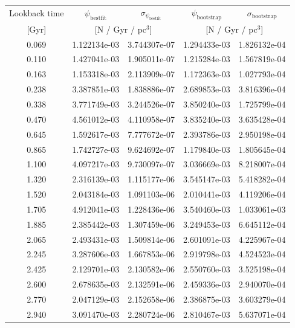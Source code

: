 \documentclass[fleqn,usenatbib]{mnras}
\begin{document}
\begin{table}
    \centering
    \begin{tabular}{c|cc|cc}
    Lookback time & $\psi_{\mathrm{best fit}}$ & $\sigma_{\psi_{\mathrm{best fit}}}$ & $\psi_{\mathrm{bootstrap}}$ & $\sigma_{\mathrm{bootstrap}}$ \\
         {[Gyr]} & \multicolumn{2}{c|}{[N / Gyr / pc$^3$]} & \multicolumn{2}{c}{[N / Gyr / pc$^3$]} \\\hline\hline
    0.069  & 1.122134e-03 & 3.744307e-07 & 1.294433e-03 & 1.826132e-04 \\
    0.110  & 1.427041e-03 & 1.905011e-07 & 1.215284e-03 & 1.567819e-04 \\
    0.163  & 1.153318e-03 & 2.113909e-07 & 1.172363e-03 & 1.027793e-04 \\
    0.238  & 3.387851e-03 & 1.838886e-07 & 2.689853e-03 & 3.816396e-04 \\
    0.338  & 3.771749e-03 & 3.244526e-07 & 3.850240e-03 & 1.725799e-04 \\ \hline
    0.470  & 4.561012e-03 & 4.110958e-07 & 3.835240e-03 & 3.635428e-04 \\
    0.645  & 1.592617e-03 & 7.777672e-07 & 2.393786e-03 & 2.950198e-04 \\
    0.865  & 1.742727e-03 & 9.624692e-07 & 1.179840e-03 & 1.805645e-04 \\
    1.100  & 4.097217e-03 & 9.730097e-07 & 3.036669e-03 & 8.218007e-04 \\
    1.320  & 2.316139e-03 & 1.115177e-06 & 3.545147e-03 & 5.418282e-04 \\ \hline
    1.520  & 2.043184e-03 & 1.091103e-06 & 2.010441e-03 & 4.119206e-04 \\
    1.705  & 4.912041e-03 & 1.228436e-06 & 3.540460e-03 & 1.033061e-03 \\
    1.885  & 2.385442e-03 & 1.307459e-06 & 3.249453e-03 & 6.645112e-04 \\
    2.065  & 2.493431e-03 & 1.509814e-06 & 2.601091e-03 & 4.225967e-04 \\
    2.245  & 3.287606e-03 & 1.667853e-06 & 2.919798e-03 & 4.524523e-04 \\ \hline
    2.425  & 2.129701e-03 & 2.130582e-06 & 2.550760e-03 & 3.525198e-04 \\
    2.600  & 2.678635e-03 & 2.132591e-06 & 2.459336e-03 & 2.940070e-04 \\
    2.770  & 2.047129e-03 & 2.152658e-06 & 2.386875e-03 & 3.603279e-04 \\
    2.940  & 3.091470e-03 & 2.280724e-06 & 2.810467e-03 & 5.637071e-04 \\

\end{tabular}
\end{table}
\end{document}
